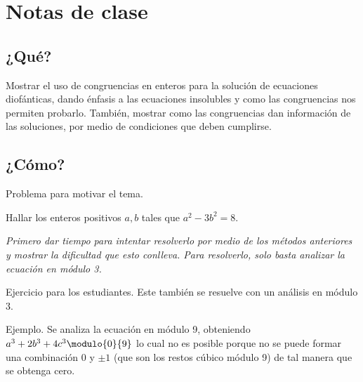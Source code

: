 \newpage
\section{Notas de clase}

\subsection{¿Qué?}

Mostrar el uso de congruencias en enteros para la solución de ecuaciones diofánticas, dando énfasis a las ecuaciones insolubles
y como las congruencias nos permiten probarlo.
También, mostrar como las congruencias dan información de las soluciones, por medio de condiciones que deben cumplirse.

\subsection{¿Cómo?}

Problema para motivar el tema.

\begin{activity}[Ejercicio 3][10 min]
    Hallar los enteros positivos $a,b$ tales que $a^2 - 3b^2 = 8$.
\end{activity}

\textit{Primero dar tiempo para intentar resolverlo por medio de los métodos anteriores y mostrar la dificultad que esto conlleva.
Para resolverlo, solo basta analizar la ecuación en módulo 3.}

\begin{activity}[Ejercicio 8][8 min]
    Ejercicio para los estudiantes.
    Este también se resuelve con un análisis en módulo 3.
\end{activity}

\begin{activity}[Ejercicio 10][15 min]
    Ejemplo.
    Se analiza la ecuación en módulo 9, obteniendo $a^3 + 2b^3 + 4c^3 \modulo{0}{9}$ lo cual no es posible porque no se
    puede formar una combinación 0 y $\pm1$ (que son los restos cúbico módulo 9) de tal manera que se obtenga cero.
\end{activity}